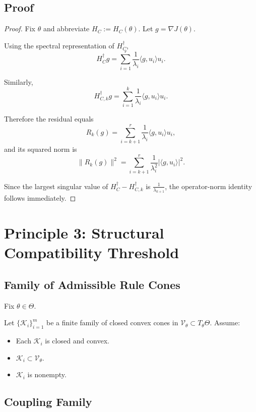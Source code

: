 \documentclass[11pt,a4paper,twocolumn]{article}
\begin{document}
 \subsection{Proof}
 
 \begin{proof}
  Fix $\theta$ and abbreviate $H_C := H_C(\theta)$.
  Let $g = \nabla J(\theta)$.
  
  Using the spectral representation of $H_C^\dagger$,
  \[
  H_C^\dagger g
  =
  \sum_{i=1}^{r}
  \frac{1}{\lambda_i}
  \langle g,u_i\rangle u_i.
  \]
  
  Similarly,
  \[
  H_{C,k}^\dagger g
  =
  \sum_{i=1}^{k}
  \frac{1}{\lambda_i}
  \langle g,u_i\rangle u_i.
  \]
  
  Therefore the residual equals
  \[
  R_k(g)
  =
  \sum_{i=k+1}^{r}
  \frac{1}{\lambda_i}
  \langle g,u_i\rangle u_i,
  \]
  and its squared norm is
  \[
  \|R_k(g)\|^2
  =
  \sum_{i=k+1}^{r}
  \frac{1}{\lambda_i^2}
  |\langle g,u_i\rangle|^2.
  \]
  
  Since the largest singular value of
  $H_C^\dagger - H_{C,k}^\dagger$
  is $\frac{1}{\lambda_{k+1}}$,
  the operator-norm identity follows immediately.
 \end{proof}
 
\section{Principle 3: Structural Compatibility Threshold}

\subsection{Family of Admissible Rule Cones}

Fix $\theta \in \Theta$.

Let $\{ \mathcal{K}_i \}_{i=1}^m$ be a finite family of closed convex cones in 
$\mathcal{V}_\theta \subset T_\theta\Theta$.
Assume:

\begin{itemize}
 \item[(C1)] Each $\mathcal{K}_i$ is closed and convex.
 \item[(C2)] $\mathcal{K}_i \subset \mathcal{V}_\theta$.
 \item[(C3)] $\mathcal{K}_i$ is nonempty.
\end{itemize}

\subsection{Coupling Family}
\end{document}
